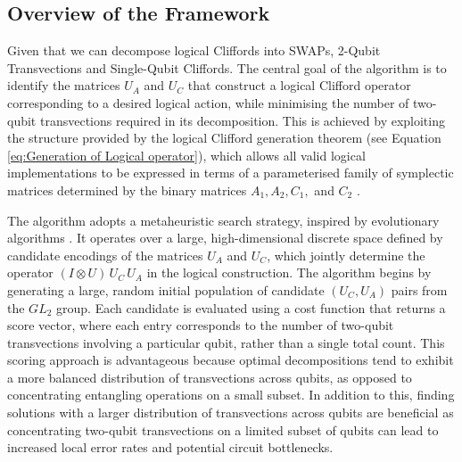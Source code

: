 \subsection{Overview of the Framework}
Given that we can decompose logical Cliffords into SWAPs,  2-Qubit Transvections and Single-Qubit Cliffords. The central goal of the algorithm is to identify the matrices \(U_A\) and \(U_C\) that construct a logical Clifford operator corresponding to a desired logical action, while minimising the number of two-qubit transvections required in its decomposition. This is achieved by exploiting the structure provided by the logical Clifford generation theorem (see Equation \ref{eq:Generation of Logical operator}), which allows all valid logical implementations to be expressed in terms of a parameterised family of symplectic matrices determined by the binary matrices 
\(A_1,A_2,C_1,\) and \(C_2\) .

The algorithm adopts a metaheuristic search strategy, inspired by evolutionary algorithms \cite{luke2009essentials}. It operates over a large, high-dimensional discrete space defined by candidate encodings of the matrices 
\(U_A\) and \(U_C\), which jointly determine the operator \((I \otimes U)\, U_C\, U_A\) in the logical construction. The algorithm begins by generating a large, random initial population of candidate \((U_C,U_A)\) pairs from the \(GL_2\) group. Each candidate is evaluated using a cost function that returns a score vector, where each entry corresponds to the number of two-qubit transvections involving a particular qubit, rather than a single total count. This scoring approach is advantageous because optimal decompositions tend to exhibit a more balanced distribution of transvections across qubits, as opposed to concentrating entangling operations on a small subset. In addition to this, finding solutions with a larger distribution of transvections across qubits are beneficial as concentrating two-qubit transvections on a limited subset of qubits can lead to increased local error rates and potential circuit bottlenecks.

